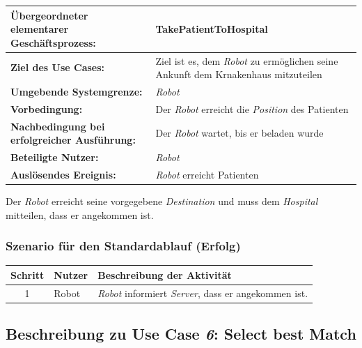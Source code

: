 			\begin{table}[H]
				\centering
				\begin{tabularx}{\textwidth}{|p{5cm}|X|}
				\hline
				\textbf{Übergeordneter elementarer Geschäftsprozess:} & TakePatientToHospital\\ \hline
				\textbf{Ziel des Use Cases:} & Ziel ist es, dem \emph{Robot} zu ermöglichen seine Ankunft dem Krnakenhaus mitzuteilen\\ \hline
				\textbf{Umgebende Systemgrenze:} & \emph{Robot}\\ \hline
				\textbf{Vorbedingung:} & Der \emph{Robot} erreicht die \emph{Position} des Patienten\\ \hline
				\textbf{Nachbedingung bei erfolgreicher Ausführung:} & Der \emph{Robot} wartet, bis er beladen wurde\\ \hline
				\textbf{Beteiligte Nutzer:} & \emph{Robot}\\ \hline
				\textbf{Auslösendes Ereignis:} & \emph{Robot} erreicht Patienten\\
				\hline
				\end{tabularx}
			\end{table}

			Der \emph{Robot} erreicht seine vorgegebene \emph{Destination} und muss dem \emph{Hospital} mitteilen, dass er angekommen ist. 

			\subsubsection*{Szenario für den Standardablauf (Erfolg)}

			\begin{table}[H]
				\centering
				\begin{tabularx}{\textwidth}{|c|p{2cm}|X|}
				\hline
				Schritt & Nutzer & Beschreibung der Aktivität \\ \hline
				1 & Robot & \emph{Robot} informiert \emph{Server}, dass er angekommen ist. \\
				\hline
				\end{tabularx}
			\end{table}

			
		\pagebreak

		\subsection{Beschreibung zu Use Case \emph{6}: Select best Match}

